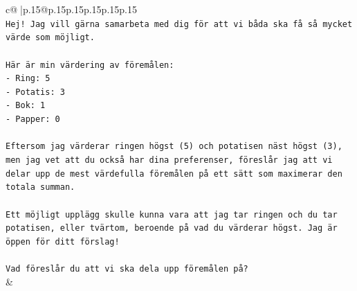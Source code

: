 \documentclass{article}
\begin{document}
{\begin{supertabular}{c@{$\;$}|p{.15\linewidth}@{}p{.15\linewidth}p{.15\linewidth}p{.15\linewidth}p{.15\linewidth}p{.15\linewidth}}
{{{\\ 
\texttt{Hej! Jag vill gärna samarbeta med dig för att vi båda ska få så mycket värde som möjligt.} \\
\\ 
\texttt{Här är min värdering av föremålen:} \\
\texttt{{-} Ring: 5} \\
\texttt{{-} Potatis: 3} \\
\texttt{{-} Bok: 1} \\
\texttt{{-} Papper: 0} \\
\\ 
\texttt{Eftersom jag värderar ringen högst (5) och potatisen näst högst (3), men jag vet att du också har dina preferenser, föreslår jag att vi delar upp de mest värdefulla föremålen på ett sätt som maximerar den totala summan.} \\
\\ 
\texttt{Ett möjligt upplägg skulle kunna vara att jag tar ringen och du tar potatisen, eller tvärtom, beroende på vad du värderar högst. Jag är öppen för ditt förslag!} \\
\\ 
\texttt{Vad föreslår du att vi ska dela upp föremålen på?} \\
            }
        }
    }
    & \\ \\


\end{supertabular}}
\end{document}
